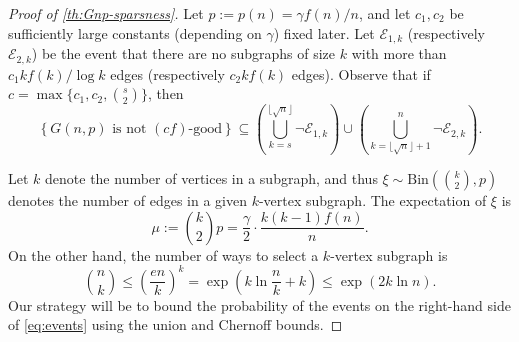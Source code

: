 \documentclass[letterpaper,11pt]{article}
\theoremstyle{definition}
\theoremstyle{remark}
\renewcommand{\leq}{\leqslant}
\begin{document}
	\begin{proof}[Proof of \cref{th:Gnp-sparsness}] 	Let $p := p(n) = \gamma  f(n)/n$, and let $c_1,c_2$ be sufficiently large constants (depending on $\gamma$) fixed later. Let $\mathcal{E}_{1,k}$ (respectively $\mathcal{E}_{2,k}$) be the event that there are no subgraphs of size $k$ with more than $c_1 kf(k)/\log k$ edges (respectively $c_2 kf(k)$ edges). Observe that if $c=\max\{c_1, c_2, \binom{s}{2} \}$, then 
		\begin{equation}\label{eq:events} \left\{ G(n, p)\text{ is not } (c f)\text{-good}  \right\}\subseteq \left(\bigcup_{k= s}^{\lfloor \sqrt n \rfloor  } \neg \mathcal{E}_{1,k}\right) \cup \left(\bigcup_{k= \lfloor \sqrt n \rfloor +1   }^n \neg \mathcal{E}_{2,k}\right). \end{equation}  

	
	Let  $k$ denote the number of vertices in a subgraph, and thus $\xi\sim\mathrm{Bin}\left({k\choose 2},p\right)$ denotes the number of edges in a given $k$-vertex subgraph.  The expectation of $\xi$ is  
	\begin{equation*} 
		\mu:={k\choose 2}p = \frac{\gamma }{2}\cdot \frac{k(k-1)f(n)}{n}.
	\end{equation*} 
	On the other hand, the number of ways to select a $k$-vertex subgraph is  
\begin{equation}\label{eq:nchoosek}
	{n\choose k}\leq\left(\frac{en}{k}\right)^k=\exp\left(k\ln\frac{n}{k}+k\right) \leq \exp\left(2k\ln n\right).\end{equation}
Our strategy will be to bound the probability of the events on the right-hand side of \eqref{eq:events} using the union and Chernoff bounds.


\end{proof}
\end{document}
